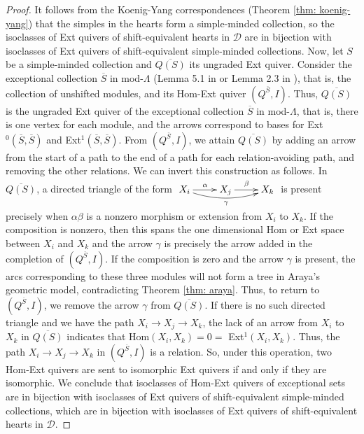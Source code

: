 \documentclass[12pt]{amsart}
\theoremstyle{definition}
\theoremstyle{remark}
\numberwithin{equation}{section}
\newcommand{\cD}{\ensuremath{{\mathcal{D}}}}
\begin{document}
\begin{proof}
    It follows from the Koenig-Yang correspondences (Theorem \ref{thm: koenig-yang}) that the simples in the hearts form a simple-minded collection, so the isoclasses of Ext quivers of shift-equivalent hearts in $\cD$ are in bijection with isoclasses of Ext quivers of shift-equivalent simple-minded collections. Now, let $S$ be a simple-minded collection and $\overline{Q(S)}$ its ungraded Ext quiver. Consider the exceptional collection $\overline{S}$ in mod-$\Lambda$ (Lemma 5.1 in \cite{simoes2022functorially} or Lemma 2.3 in 
    \cite{buan2012m}), that is, the collection of unshifted modules, and its Hom-Ext quiver $(Q^{\overline{S}},I)$. Thus, $\overline{Q(S)}$ is the ungraded Ext quiver of the exceptional collection $\overline{S}$ in mod-$\Lambda$, that is, there is one vertex for each module, and the arrows correspond to bases for Ext$^0(\overline{S},\overline{S})$ and Ext$^1(\overline{S},\overline{S})$. From $(Q^{\overline{S}},I)$, we attain $\overline{Q(S)}$ by adding an arrow from the start of a path to the end of a path for each relation-avoiding path, and removing the other relations. {\color{black} We can invert this construction as follows. In $\overline{Q(S)}$, a directed triangle of the form $\xymatrix{
  X_i \ar@/_0.7pc/[rr]_{\gamma} \ar[r]^{\alpha} & X_j \ar[r]^{\beta} & X_k}$ is present precisely when $\alpha\beta$ is a nonzero morphism or extension from $X_i$ to $X_k$. If the composition is nonzero, then this spans the one dimensional Hom or Ext space between $X_i$ and $X_k$ and the arrow $\gamma$ is precisely the arrow added in the completion of $(Q^{\overline{S}},I)$. If the composition is zero and the arrow $\gamma$ is present, the arcs corresponding to these three modules will not form a tree in Araya's geometric model, contradicting Theorem \ref{thm: araya}. Thus, to return to $(Q^{\overline{S}},I)$, we remove the arrow $\gamma$ from $\overline{Q(S)}$. If there is no such directed triangle and we have the path $X_i \rightarrow X_j \rightarrow X_k$, the lack of an arrow from $X_i$ to $X_k$ in $\overline{Q(S)}$ indicates that Hom$(X_i,X_k) = 0 =$ Ext$^1(X_i,X_k)$. Thus, the path $X_i \rightarrow X_j \rightarrow X_k$ in $(Q^{\overline{S}},I)$ is a relation.} So, under this operation, two Hom-Ext quivers are sent to isomorphic Ext quivers if and only if they are isomorphic. We conclude that isoclasses of Hom-Ext quivers of exceptional sets are in bijection with isoclasses of Ext quivers of shift-equivalent simple-minded collections, which are in bijection with isoclasses of Ext quivers of shift-equivalent hearts in $\cD$.
\end{proof}
\end{document}
